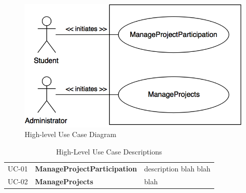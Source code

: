 \documentclass[12pt,letterpaper]{article}
\begin{document}
\begin{figure}[H]
	\centering{}
	\includegraphics[scale=0.4]{imgs/high-level-use-case-diagram.png}
	\caption{High-level Use Case Diagram}
\end{figure}

\begin{table}[H]
\caption{High-Level Use Case Descriptions}
\renewcommand{\arraystretch}{1.5}
\everyrow{\hline}
\begin{tabu} to 
UC-01 & ManageProjectParticipation & description blah blah \\
UC-02 & ManageProjects & blah \\
\end{tabu}
\end{table}
\end{document}
